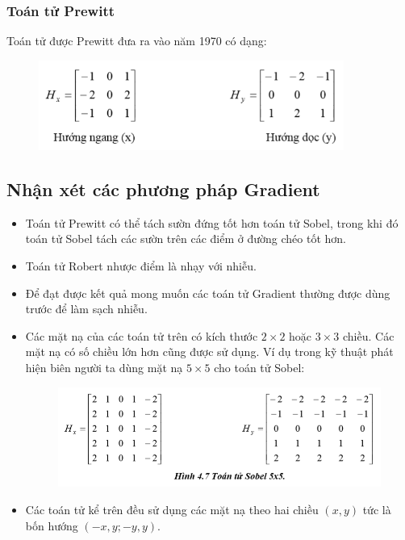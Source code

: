 \documentclass[../report.tex]{subfiles}
\begin{document}
\subsubsection{Toán tử Prewitt}
Toán tử được Prewitt đưa ra vào năm 1970 có dạng:
\begin{figure}[H]
\centering
\includegraphics[width=10cm]{figures/prewitt-operator.png}
\end{figure}

\subsection{Nhận xét các phương pháp Gradient}
\begin{itemize}
\item Toán tử Prewitt có thể tách sườn đứng tốt hơn toán tử Sobel, 
trong khi đó toán tử Sobel tách các sườn trên các điểm ở 
đường chéo tốt hơn.

\item Toán tử Robert nhược điểm là nhạy với nhiễu.

\item Để đạt được kết quả mong muốn các toán tử Gradient 
    thường được dùng trước để làm sạch nhiễu.

\item Các mặt nạ của các toán tử trên có kích 
thước $2 \times 2$ hoặc $3 \times 3$ chiều. 
Các mặt nạ có số chiều lớn hơn cũng được sử dụng. 
Ví dụ trong kỹ thuật phát hiện biên người ta dùng mặt 
nạ $5 \times 5$ cho toán tử Sobel:
\begin{figure}[H]
\centering
\includegraphics[width=12cm]{figures/sobel-5x5.png}
\end{figure}

\item Các toán tử kể trên đều sử dụng các mặt nạ theo 
hai chiều $(x, y)$ tức là bốn hướng $(-x, y; -y, y)$.
\end{itemize}
\end{document}
